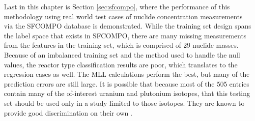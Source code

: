 Last in this chapter is Section \ref{sec:sfcompo}, where the performance of
this methodology using real world test cases of nuclide concentration
measurements via the \gls{SFCOMPO} database is demonstrated.  While the
training set design spans the label space that exists in \gls{SFCOMPO}, there
are many missing measurements from the features in the training set, which is
comprised of 29 nuclide masses.  Because of an imbalanced training set and the
method used to handle the null values, the reactor type classification results
are poor, which translates to the regression cases as well.  The \gls{MLL}
calculations perform the best, but many of the prediction errors are still
large. It is possible that because most of the 505 entries contain many of the
of-interest uranium and plutonium isotopes, that this testing set should be
used only in a study limited to those isotopes. They are known to provide good
discrimination on their own \cite{pu_discrimination, nicolaou_2006,
nicolaou_pu, nicolaou_2009, nicolaou_2014, nicolaou_2015}.
